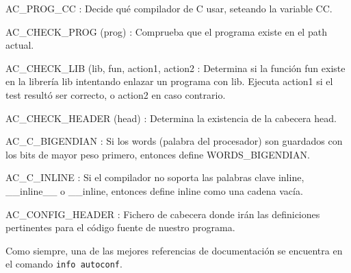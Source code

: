 \begin{description}

\item{AC\_PROG\_CC} :  Decide qué  compilador de  C usar,  seteando la
variable CC.

\item{AC\_CHECK\_PROG (prog)} : Comprueba que el programa existe en el
path actual.

\item{AC\_CHECK\_LIB (lib,  fun, action1,  action2} : Determina  si la
función fun existe  en la librería lib intentando  enlazar un programa
con lib. Ejecuta action1 si el test resultó ser correcto, o action2 en
caso contrario.

\item{AC\_CHECK\_HEADER  (head)}  :  Determina  la  existencia  de  la
cabecera head.

\item{AC\_C\_BIGENDIAN} :  Si los  words (palabra del  procesador) son
guardados  con  los  bits  de  mayor  peso  primero,  entonces  define
WORDS\_BIGENDIAN.

\item{AC\_C\_INLINE} : Si el compilador  no soporta las palabras clave
inline, \_\_inline\_\_  o \_\_inline, entonces define  inline como una
cadena vacía.

\item{AC\_CONFIG\_HEADER}  :  Fichero  de   cabecera  donde  irán  las
definiciones pertinentes para el código fuente de nuestro programa.

\end{description}

Como  siempre, una  de  las mejores  referencias  de documentación  se
encuentra en el comando {\tt info  autoconf}. %
